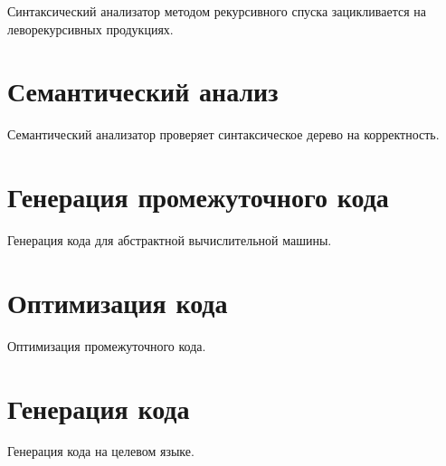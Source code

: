 \documentclass[oneside]{book}
\begin{document}
    Синтаксический анализатор методом рекурсивного спуска зацикливается
    на леворекурсивных продукциях.

    \chapter{Семантический анализ}
    Семантический анализатор проверяет синтаксическое дерево на корректность.

    \chapter{Генерация промежуточного кода}
    Генерация кода для абстрактной вычислительной машины.

    \chapter{Оптимизация кода}
    Оптимизация промежуточного кода.

    \chapter{Генерация кода}
    Генерация кода на целевом языке.
\end{document}
